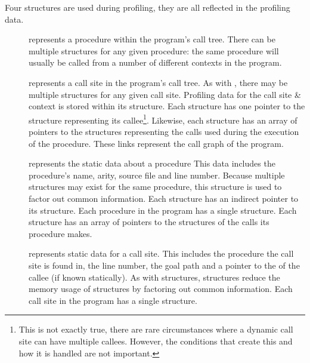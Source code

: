 Four structures are used during profiling,
they are all reflected in the profiling data.

\begin{description}

    \item[\PD]
    represents a procedure within the program's call tree.
    There can be multiple \PD structures for any given procedure:
    the same procedure will usually be called from a number of different
    contexts in the program.

    \item[\CSD]
    represents a call site in the program's call tree.
    As with \PD, there may be multiple \CSD structures for any given
    call site.
    Profiling data for the call site \& context is stored within its \CSD
    structure.
    Each \CSD structure has one pointer to the \PD structure representing
    its callee\footnote{
        This is not exactly true,
        there are rare circumstances where a dynamic call site can have
        multiple callees.
        However, the conditions that create this and how it is handled
        are not important.}.
    Likewise, each \PD structure has an array of pointers to the \CSD
    structures representing the calls used during the execution of the
    procedure.
    These links represent the call graph of the program.

    \item[\PS]
    represents the static data about a procedure
    This data includes the procedure's name, arity, source file and line
    number.
    Because multiple \PD structures may exist for the same procedure,
    this structure is used to factor out common information.
    Each \PD structure has an indirect pointer to its \PS structure.
    Each procedure in the program has a single \PS structure.
    Each \PS structure has an array of pointers to the \CSS structures
    of the calls its procedure makes.

    \item[\CSS]
    represents static data for a call site.
    This includes the procedure the call site is found in, the line number,
    the goal path and a pointer to the \PS of the callee (if known
    statically).
    As with \PS structures,
    \CSS structures reduce the memory usage of \CSD structures by
    factoring out common information.
    Each call site in the program has a single \CSS structure.

\end{description}

